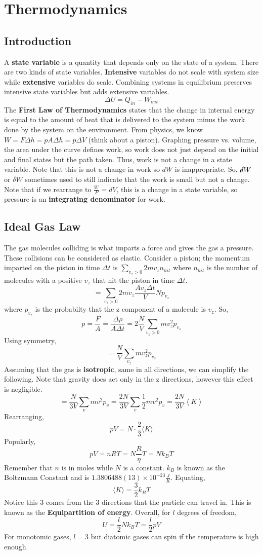 \documentclass[../main.tex]{subfiles}
\newcommand{\expect}[1]{{\langle #1 \rangle}}
\newcommand{\expectl}[1]{{\left\langle #1 \right\rangle}}
\begin{document}
\chapter{Thermodynamics}
\section{Introduction}
A \textbf{state variable} is a quantity that depends only on the state of a
system. There are two kinds of state variables. \textbf{Intensive} variables
do not scale with system size while \textbf{extensive} variables do scale.
Combining systems in equilibrium preserves intensive state variables but 
adds extensive variables.
$$\Delta U=Q_{in}-W_{out}$$
The \textbf{First Law of Thermodynamics} states that the change in internal energy
is equal to the amount of heat that is delivered
to the system minus the work done by the system on the environment. From physics,
we know $W=F\Delta h=pA\Delta h=p\Delta V$ (think about a piston). Graphing pressure
vs. volume, the area under the curve defines work, so work does not just depend on the
initial and final states but the path taken. Thus, work is not a change in a state variable.
Note that this is not a change in work so $dW$ is inappropriate. So, $\cancel{d}W$ or $\delta W$
sometimes used to still indicate that the work is small but not a change. Note that if we
rearrange to $\frac{W}{P}=dV$, this is a change in a state variable, so pressure is an 
\textbf{integrating denominator} for work.

\section{Ideal Gas Law}
The gas molecules colliding is what imparts a force and gives the gas a pressure.
These collisions can be considered as elastic. Consider a piston; the momentum imparted
on the piston in time $\Delta t$ is $\sum_{v_{z}>0}2mv_{z}n_{hit}$ where $n_{hit}$ is the
number of molecules with a positive $v_{z}$ that hit the piston in time $\Delta t$. 
$$=\sum_{v_{z}>0}2mv_{z}\frac{Av_{z}\Delta t}{V}Np_{v_{z}}$$
where $p_{v_{z}}$ is the probabilty that the z component of a molecule is $v_{z}$.
So,
$$p=\frac{F}{A}=\frac{\Delta\rho}{A\Delta t}=2\frac{N}{V}\sum_{v_{z}>0}mv_{z}^{2}p_{v_{z}}$$
Using symmetry,
$$=\frac{N}{V}\sum_{v_{z}}mv_{z}^{2}p_{v_{z}}$$
Assuming that the gas is \textbf{isotropic}, same in all directions, we can simplify the following.
Note that gravity does act only in the z directions, however this effect is negligible.
$$=\frac{N}{3V}\sum_{v}mv^{2}p_{v}=\frac{2N}{3V}\sum_{v}\frac{1}{2}mv^{2}p_{v}=\frac{2N}{3V}\expectl{K}$$
Rearranging,
$$pV=N\cdot\frac{2}{3}\expect{K}$$
Popularly,
$$pV=nRT=N\frac{R}{\eta}T=Nk_{B}T$$
Remember that $n$ is in moles while $N$ is a constant. $k_{B}$ is known as the Boltzmann Constant
and is $1.3806488(13)\times 10^{-23}\frac{J}{K}$. Equating,
$$\expect{K}=\frac{3}{2}k_{B}T$$
Notice this 3 comes from the 3 directions that the particle can travel in. This is known as the
\textbf{Equipartition of energy}. Overall, for $l$ degrees of freedom,
$$U=\frac{l}{2}Nk_{B}T=\frac{l}{2}pV$$
For monotomic gases, $l=3$ but diatomic gases can spin if the temperature is high enough.
\end{document}
